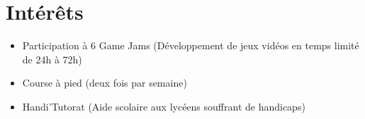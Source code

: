 \documentclass[11pt, a4paper, sans]{moderncv}
\begin{document}
\section{Intérêts}
\begin{itemize}[label=\textbullet]
	\setlength\itemsep{0mm}
	\item Participation à 6 Game Jams (Développement de jeux vidéos en temps limité de 24h à 72h)
	\item Course à pied (deux fois par semaine)
	\item Handi'Tutorat (Aide scolaire aux lycéens souffrant de handicaps)
\end{itemize}
\end{document}
